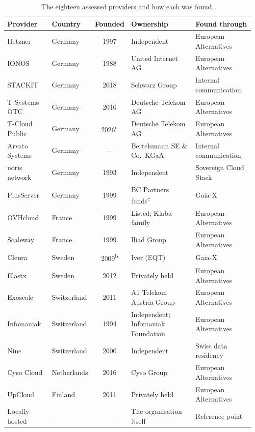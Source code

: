 \begin{table}[htbp]
  \centering
  \caption{The eighteen assessed providers and how each was found.}
  \label{tab:providers}
  \footnotesize
  \begin{tabular}{@{}l l c >{\raggedright\arraybackslash}p{4.3cm}
                           >{\raggedright\arraybackslash}p{3.5cm}@{}}
    \toprule
    \textbf{Provider} & \textbf{Country} & \textbf{Founded} & \textbf{Ownership}
      & \textbf{Found through} \\
    \midrule
    Hetzner            & Germany     & 1997 & Independent                & European Alternatives \\
    IONOS              & Germany     & 1988 & United Internet AG         & European Alternatives \\
    STACKIT            & Germany     & 2018 & Schwarz Group              & Internal communication \\
    T-Systems \acs{OTC} & Germany     & 2016 & Deutsche Telekom AG        & European Alternatives \\
    T-Cloud Public     & Germany     & 2026\textsuperscript{a} & Deutsche Telekom AG        & European Alternatives \\
    Arvato Systems     & Germany     & ---  & Bertelsmann SE \& Co.\ KGaA & Internal communication \\
    noris network      & Germany     & 1993 & Independent                & Sovereign Cloud Stack \\
    PlusServer         & Germany     & 1999 & BC Partners funds\textsuperscript{c} & Gaia-X \\
    OVHcloud           & France      & 1999 & Listed; Klaba family       & European Alternatives \\
    Scaleway           & France      & 1999 & Iliad Group                & European Alternatives \\
    Cleura             & Sweden      & 2009\textsuperscript{b} & Iver (EQT)                 & Gaia-X \\
    Elastx             & Sweden      & 2012 & Privately held             & European Alternatives \\
    Exoscale           & Switzerland & 2011 & A1 Telekom Austria Group   & European Alternatives \\
    Infomaniak         & Switzerland & 1994 & Independent; Infomaniak Foundation & European Alternatives \\
    Nine               & Switzerland & 2000 & Independent                & Swiss data residency \\
    Cyso Cloud         & Netherlands & 2016 & Cyso Group                 & European Alternatives \\
    UpCloud            & Finland     & 2011 & Privately held             & European Alternatives \\
    Locally hosted     & ---         & ---  & The organisation itself    & Reference point \\
    \bottomrule
  \end{tabular}


\end{table}
